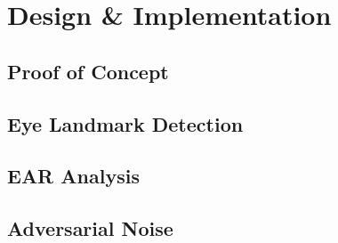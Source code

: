 \chapter{Design \& Implementation}
\label{ch:design-implementation}

\section{Proof of Concept}

\section{Eye Landmark Detection}

\section{EAR Analysis}

\section{Adversarial Noise}